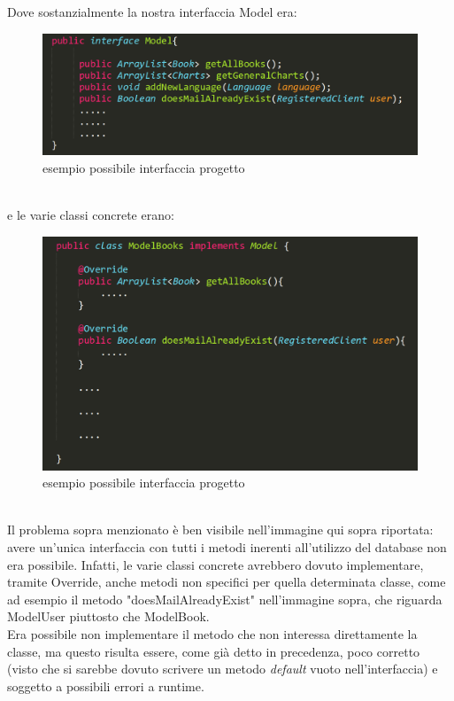 \documentclass[a4paper,11pt]{report}
\begin{document}
Dove sostanzialmente la nostra interfaccia Model era:\\
\begin{figure}[h!]
    	\centering
    	\includegraphics[width=1\linewidth]{Other/interfaccia.PNG}
    	\caption{esempio possibile interfaccia progetto}
    \end{figure}\\

e le varie classi concrete erano:\\
\begin{figure}[h!]
    	\centering
    	\includegraphics[width=1\linewidth]{Other/classe.PNG}
    	\caption{esempio possibile interfaccia progetto}
    \end{figure}\\

Il problema sopra menzionato è ben visibile nell'immagine qui sopra riportata: avere un'unica interfaccia con tutti i metodi inerenti all'utilizzo del database non era possibile. Infatti, le varie classi concrete avrebbero dovuto implementare, tramite Override, anche metodi non specifici per quella determinata classe, come ad esempio il metodo "doesMailAlreadyExist" nell'immagine sopra, che riguarda ModelUser piuttosto che ModelBook.\\

Era possibile non implementare il metodo che non interessa direttamente la classe, ma questo risulta essere, come già detto in precedenza, poco corretto (visto che si sarebbe dovuto scrivere un metodo \textit{default} vuoto nell'interfaccia) e soggetto a possibili errori a runtime.\\
\end{document}
